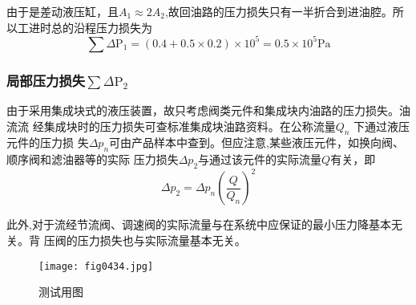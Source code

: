 由于是差动液压缸，且$A_1\approx 2A_2$,故回油路的压力损失只有一半折合到进油腔。所以工进时总的沿程压力损失为
$$
\sum \Delta \text{P}_1=(0.4+0.5\times 0.2)\times 10^5=0.5\times 10^5\text{Pa}
$$
\subsubsection*{局部压力损失$\sum \Delta \text {P}_2$}

由于采用集成块式的液压装置，故只考虑阀类元件和集成块内油路的压力损失。油流流
经集成块时的压力损失可查标准集成块油路资料。在公称流量$Q_n$   下通过液压元件的压力损
失$\Delta p_n$可由产品样本中查到。但应注意,某些液压元件，如换向阀、顺序阀和滤油器等的实际
压力损失$\Delta p_2$与通过该元件的实际流量$Q$有关，即
\begin{equation}
\Delta p_{2} =\Delta p_n(\frac{Q}{Q_n})^2
\end{equation}

此外,对于流经节流阀、调速阀的实际流量与在系统中应保证的最小压力降基本无关。背
压阀的压力损失也与实际流量基本无关。
\begin{figure}[!hbt]
\centering
\ifOpenSource

\else 
\texttt{[image: fig0434.jpg]}
\fi
\caption{测试用图}
\label{fig:fig0434}
\end{figure}
